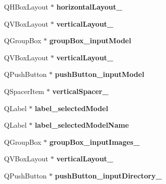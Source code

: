 \begin{DoxyCompactItemize}
Q\+H\+Box\+Layout $\ast$ {\bfseries horizontal\+Layout\+\_}
\item 
\mbox{\label{class_ui___main_window_ad9eb495f2ef1fdec850aca1c0ea2088c}} 
Q\+V\+Box\+Layout $\ast$ {\bfseries vertical\+Layout\+\_}
\item 
\mbox{\label{class_ui___main_window_af8df8adf03f1c3e74e15985ff6ed8ea0}} 
Q\+Group\+Box $\ast$ {\bfseries group\+Box\+\_\+input\+Model}
\item 
\mbox{\label{class_ui___main_window_a04ce3ef61cc4b4fb628b2a258275f5ef}} 
Q\+V\+Box\+Layout $\ast$ {\bfseries vertical\+Layout\+\_}
\item 
\mbox{\label{class_ui___main_window_a07bf43d30167cd9b8d80139f4fada817}} 
Q\+Push\+Button $\ast$ {\bfseries push\+Button\+\_\+input\+Model}
\item 
\mbox{\label{class_ui___main_window_adc1f5fdd97fb3729999c56902d0fa591}} 
Q\+Spacer\+Item $\ast$ {\bfseries vertical\+Spacer\+\_}
\item 
\mbox{\label{class_ui___main_window_a5dd20655331f5f45181c6a318651e644}} 
Q\+Label $\ast$ {\bfseries label\+\_\+selected\+Model}
\item 
\mbox{\label{class_ui___main_window_a2e9cc314e5521e7de30f55cc4c9e4f2b}} 
Q\+Label $\ast$ {\bfseries label\+\_\+selected\+Model\+Name}
\item 
\mbox{\label{class_ui___main_window_a03351c09b43df9eac26f0abeb12dfd25}} 
Q\+Group\+Box $\ast$ {\bfseries group\+Box\+\_\+input\+Images\+\_}
\item 
\mbox{\label{class_ui___main_window_ab35de77115e747d4efa5ecde01d9c16a}} 
Q\+V\+Box\+Layout $\ast$ {\bfseries vertical\+Layout\+\_}
\item 
\mbox{\label{class_ui___main_window_a1a6883c360d54fc2a961b253ebb4b7f2}} 
Q\+Push\+Button $\ast$ {\bfseries push\+Button\+\_\+input\+Directory\+\_}

\end{DoxyCompactItemize}
